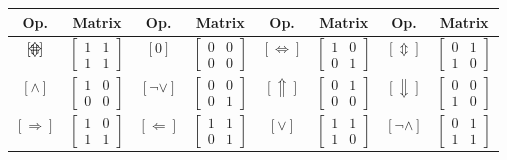 \documentclass[10pt]{article}
\def\impax{\mathrel{\ThisStyle{\kern 0pt\stackinset{c}{0\LMpt}{b}{3\LMpt}%
  {\scalebox{1}[1]{$\SavedStyle\Leftrightarrow$}}%
  {\scalebox{1}[1]{$\SavedStyle\Updownarrow$}}}\kern 0pt}}
\begin{document}
\begin{figure}[htb] 
\begin{center}
\begin{tabular}{|c|c||c|c||c|c||c|c|} 
\hline
 Op. & Matrix & Op. & Matrix & Op. & Matrix & Op. & Matrix \\\hline
 $[\impax]$ & $\begin{bmatrix} 1 & 1 \\ 1 & 1 \end{bmatrix}$ & $[0]$ & $\begin{bmatrix} 0 & 0 \\ 0 & 0 \end{bmatrix}$ & $[\Leftrightarrow]$ & $\begin{bmatrix} 1 & 0 \\ 0 & 1 \end{bmatrix}$ & $[\Updownarrow]$ & $\begin{bmatrix} 0 & 1 \\ 1 & 0 \end{bmatrix}$\\\hline
  $[\wedge]$ & $\begin{bmatrix} 1 & 0 \\ 0 & 0 \end{bmatrix}$ & $[\neg \vee]$ & $\begin{bmatrix} 0 & 0 \\ 0 & 1 \end{bmatrix}$ & $[\Uparrow]$ & $\begin{bmatrix} 0 & 1 \\ 0 & 0 \end{bmatrix}$ & $[\Downarrow]$ & $\begin{bmatrix} 0 & 0 \\ 1 & 0 \end{bmatrix}$\\\hline
  $[\Rightarrow]$ & $\begin{bmatrix} 1 & 0 \\ 1 & 1 \end{bmatrix}$ & $[\Leftarrow]$ & $\begin{bmatrix} 1 & 1 \\ 0 & 1 \end{bmatrix}$ & $[\vee]$ & $\begin{bmatrix} 1 & 1 \\ 1 & 0 \end{bmatrix}$ & $[\neg \wedge]$ & $\begin{bmatrix} 0 & 1 \\ 1 & 1 \end{bmatrix}$\\\hline

\end{tabular}
\end{center}
\end{figure}
\end{document}
